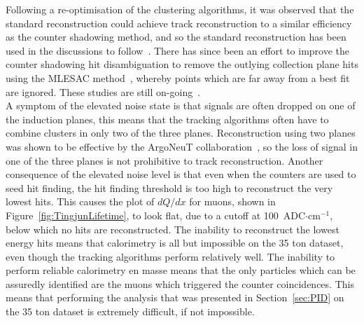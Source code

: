 Following a re-optimisation of the clustering algorithms, it was observed that the standard reconstruction could achieve track reconstruction to a similar efficiency as the counter shadowing method, and so the standard reconstruction has been used in the discussions to follow~\citep{TingjunClustering}. There has since been an effort to improve the counter shadowing hit disambiguation to remove the outlying collection plane hits using the MLESAC method~\citep{MLESAC}, whereby points which are far away from a best fit are ignored. These studies are still on-going~\citep{MattMLESAC}. \\

A symptom of the elevated noise state is that signals are often dropped on one of the induction planes, this means that the tracking algorithms often have to combine clusters in only two of the three planes. Reconstruction using two planes was shown to be effective by the ArgoNeuT collaboration~\citep{ArgoNeuT}, so the loss of signal in one of the three planes is not prohibitive to track reconstruction. Another consequence of the elevated noise level is that even when the counters are used to seed hit finding, the hit finding threshold is too high to reconstruct the very lowest hits. This causes the plot of $dQ/dx$ for muons, shown in Figure~\ref{fig:TingjunLifetime}, to look flat, due to a cutoff at 100~ADC$\cdot$cm$^{-1}$, below which no hits are reconstructed. The inability to reconstruct the lowest energy hits means that calorimetry is all but impossible on the 35 ton dataset, even though the tracking algorithms perform relatively well. The inability to perform reliable calorimetry en masse means that the only particles which can be assuredly identified are the muons which triggered the counter coincidences. This means that performing the analysis that was presented in Section~\ref{sec:PID} on the 35 ton dataset is extremely difficult, if not impossible. \\

